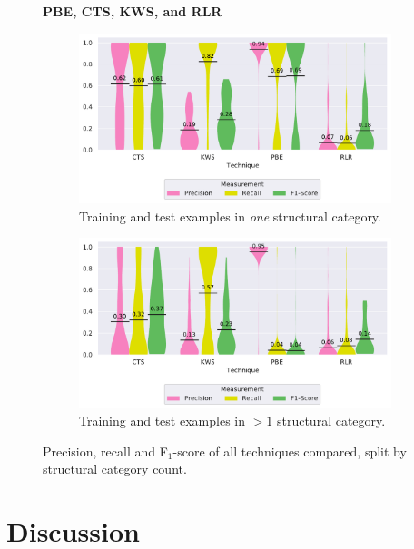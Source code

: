 \begin{figure}
\centering
    \textbf{PBE, CTS, KWS, and RLR}\par\medskip
\begin{subfigure}[b]{\columnwidth}
		\centering
				\includegraphics[width=\columnwidth,
				clip]{img/big-study/recall-precision-singlecategory-all.pdf}
		\caption{Training and test examples in \emph{one}
		structural category.}
		\label{fig:recall-precision-singlecategory-all}
\end{subfigure}\hspace{\fill}
\begin{subfigure}[b]{\columnwidth}
		\centering
				\centering
		\includegraphics[width=\columnwidth,
		clip]{img/big-study/recall-precision-multicategory-all.pdf}
		\caption{Training and test examples in $>1$ structural
		category.}
		\label{fig:recall-precision-multicategory-all}
\end{subfigure}
\caption{Precision, recall and F$_{1}$-score of all
techniques compared, split by structural category count.}
\end{figure}

\section{Discussion}
\label{sec:discussion}

